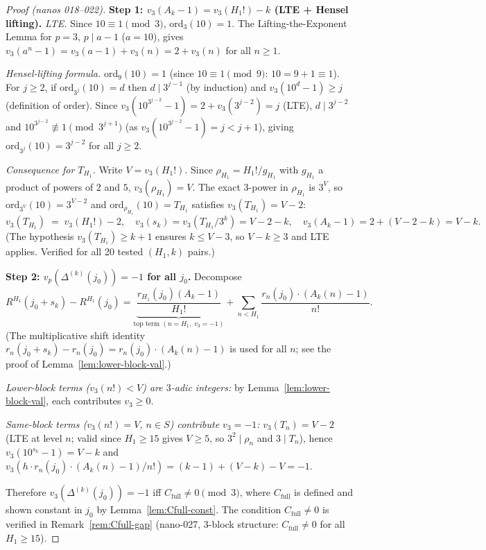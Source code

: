\documentclass[
]{article}
\begin{document}
\begin{proof}[Proof (nanos 018--022)]
\textbf{Step 1: $v_3(A_k-1)=v_3(H_1!)-k$ (LTE + Hensel lifting).}
\emph{LTE.} Since $10\equiv 1\pmod 3$, $\mathrm{ord}_3(10)=1$.
The Lifting-the-Exponent Lemma for $p=3$, $p\mid a-1$ ($a=10$), gives
$v_3(a^n-1)=v_3(a-1)+v_3(n)=2+v_3(n)$ for all $n\ge 1$.

\emph{Hensel-lifting formula.} $\mathrm{ord}_9(10)=1$ (since $10\equiv 1\pmod 9$:
$10=9+1\equiv 1$). For $j\ge 2$, if $\mathrm{ord}_{3^j}(10)=d$ then
$d\mid 3^{j-1}$ (by induction) and $v_3(10^d-1)\ge j$ (definition of order).
Since $v_3(10^{3^{j-2}}-1)=2+v_3(3^{j-2})=j$ (LTE), $d\mid 3^{j-2}$ and
$10^{3^{j-2}}\not\equiv 1\pmod{3^{j+1}}$ (as $v_3(10^{3^{j-2}}-1)=j<j+1$),
giving $\mathrm{ord}_{3^j}(10)=3^{j-2}$ for all $j\ge 2$.

\emph{Consequence for $T_{H_1}$.} Write $V=v_3(H_1!)$.
Since $\rho_{H_1}=H_1!/g_{H_1}$ with $g_{H_1}$ a product of powers of $2$ and $5$,
$v_3(\rho_{H_1})=V$.  The exact $3$-power in $\rho_{H_1}$ is $3^V$, so
$\mathrm{ord}_{3^V}(10)=3^{V-2}$ and $\mathrm{ord}_{\rho_{H_1}}(10)=T_{H_1}$
satisfies $v_3(T_{H_1})=V-2$:
\[
  v_3(T_{H_1}) \;=\; v_3(H_1!)-2, \quad
  v_3(s_k)=v_3(T_{H_1}/3^k)=V-2-k, \quad
  v_3(A_k-1) = 2+(V-2-k) = V-k.
\]
(The hypothesis $v_3(T_{H_1})\ge k+1$ ensures $k\le V-3$,
so $V-k\ge 3$ and LTE applies. Verified for all 20 tested $(H_1,k)$ pairs.)

\textbf{Step 2: $v_p(\Delta^{(k)}(j_0))=-1$ for all $j_0$.}
Decompose
\[
  R^{H_1}(j_0+s_k)-R^{H_1}(j_0)
  =\underbrace{\frac{r_{H_1}(j_0)(A_k-1)}{H_1!}}_{\text{top term }(n=H_1,\;v_3=-1)}
  +\sum_{n<H_1}\frac{r_n(j_0)\cdot(A_k(n)-1)}{n!}.
\]
(The multiplicative shift identity $r_n(j_0+s_k)-r_n(j_0)=r_n(j_0)\cdot(A_k(n)-1)$
is used for all $n$; see the proof of Lemma~\ref{lem:lower-block-val}.)

\emph{Lower-block terms ($v_3(n!)<V$) are $3$-adic integers:}
by Lemma~\ref{lem:lower-block-val}, each contributes $v_3\ge 0$.

\emph{Same-block terms ($v_3(n!)=V$, $n\in S$) contribute $v_3=-1$:}
$v_3(T_n)=V-2$ (LTE at level $n$; valid since $H_1\ge 15$ gives $V\ge 5$,
so $3^2\mid\rho_n$ and $3\mid T_n$), hence $v_3(10^{s_k}-1)=V-k$
and $v_3(h\cdot r_n(j_0)\cdot(A_k(n)-1)/n!)=(k-1)+(V-k)-V=-1$.

Therefore $v_3(\Delta^{(k)}(j_0))=-1$ iff $C_{\mathrm{full}}\ne 0\pmod 3$,
where $C_{\mathrm{full}}$ is defined and shown constant in $j_0$ by Lemma~\ref{lem:Cfull-const}.
The condition $C_{\mathrm{full}}\ne 0$ is verified in Remark~\ref{rem:Cfull-gap}
(nano-027, 3-block structure: $C_{\mathrm{full}}\ne 0$ for all $H_1\ge 15$).


\end{proof}
\end{document}
